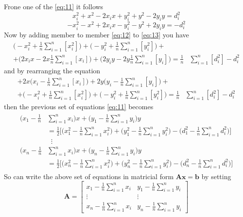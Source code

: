 \documentclass[12pt,twoside]{report}
\begin{document}
Frone one of the \ref{eq:11} it follows
\begin{equation}
x_i^2+x^2-2x_ix+y_i^2+y^2-2y_iy=d_i^2      
\end{equation}
\begin{equation}
-x_i^2-x^2+2x_ix-y_i^2-y^2+2y_iy=-d_i^2
\label{eq:13}
\end{equation}
Now by adding member to member \ref{eq:12} to \ref{eq:13} you have 
\begin{equation}
\begin{split}
    \bigg(-x_i^2  + \frac{1}{n}\sum_{i=1}^n[x_i^2]\bigg)+
    \bigg(-y_i^2+ \frac{1}{n}\sum_{i=1}^n[y_i^2]\bigg)+\\
    +\bigg(2x_ix-2x\frac{1}{n}\sum_{i=1}^n[x_i]\bigg)+
    \bigg(2y_iy -2y\frac{1}{n}\sum_{i=1}^n[y_i]\bigg)
    =\frac{1}{n}&\sum_{i=1}^n[d_i^2]-d_i^2
\end{split}    
\end{equation}
and by rearranging the equation
\begin{equation}
\begin{split}
    +2x\bigg(x_i-\frac{1}{n}\sum_{i=1}^n[x_i]\bigg)+
    2y\bigg(y_i -\frac{1}{n}\sum_{i=1}^n[y_i]\bigg)+\\
    +\bigg(-x_i^2  + \frac{1}{n}\sum_{i=1}^n[x_i^2]\bigg)+
    \bigg(-y_i^2+ \frac{1}{n}\sum_{i=1}^n[y_i^2]\bigg)
    =\frac{1}{n}&\sum_{i=1}^n[d_i^2]-d_i^2
\end{split}    
\end{equation}
then the previous set of equations \ref{eq:11} becomes
\begin{align}
\begin{split} 
    \bigg(x_1-\frac{1}{n}&\sum_{i=1}^nx_i\bigg)x+\bigg(y_1-\frac{1}{n}\sum_{i=1}^ny_i\bigg)y\\
    &=\frac{1}{2}\bigg[\bigg(x_1^2-\frac{1}{n}\sum_{i=1}^nx^2_i\bigg)+\bigg(y_1^2-\frac{1}{n}\sum_{i=1}^ny^2_i\bigg)-\bigg(d_1^2-\frac{1}{n}\sum_{i=1}^nd_i^2\bigg)\bigg]\\
&\;\;\vdots\\
    \bigg(x_n-\frac{1}{n}&\sum_{i=1}^nx_i\bigg)x+\bigg(y_n-\frac{1}{n}\sum_{i=1}^ny_i\bigg)y\\
    &=\frac{1}{2}\bigg[\bigg(x_n^2-\frac{1}{n}\sum_{i=1}^nx^2_i\bigg)+\bigg(y_n^2-\frac{1}{n}\sum_{i=1}^ny^2_i\bigg)-\bigg(d_n^2-\frac{1}{n}\sum_{i=1}^nd_i^2\bigg)\bigg]
\end{split}
\end{align}
So can write the above set of equations in matricial form $\mathbf{Ax}=\mathbf{b}$ by setting
$$
\mathbf{A}=\begin{bmatrix}
    x_1-\frac{1}{n}\sum_{i=1}^nx_i&y_1-\frac{1}{n}\sum_{i=1}^ny_i\\
    \vdots&\vdots\\
    x_n-\frac{1}{n}\sum_{i=1}^nx_i&y_n-\frac{1}{n}\sum_{i=1}^ny_i
\end{bmatrix}
$$
\end{document}
